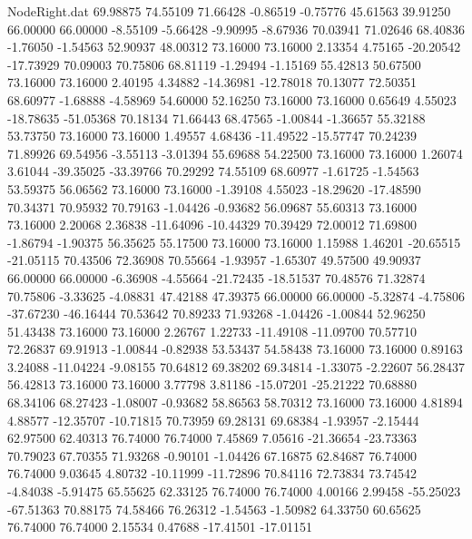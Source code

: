 \begin{filecontents}{NodeRight.dat}
  69.98875   74.55109   71.66428    -0.86519   -0.75776   45.61563   39.91250   66.00000   66.00000   -8.55109   -5.66428   -9.90995   -8.67936
  70.03941   71.02646   68.40836    -1.76050   -1.54563   52.90937   48.00312   73.16000   73.16000    2.13354    4.75165  -20.20542  -17.73929
  70.09003   70.75806   68.81119    -1.29494   -1.15169   55.42813   50.67500   73.16000   73.16000    2.40195    4.34882  -14.36981  -12.78018
  70.13077   72.50351   68.60977    -1.68888   -4.58969   54.60000   52.16250   73.16000   73.16000    0.65649    4.55023  -18.78635  -51.05368
  70.18134   71.66443   68.47565    -1.00844   -1.36657   55.32188   53.73750   73.16000   73.16000    1.49557    4.68436  -11.49522  -15.57747
  70.24239   71.89926   69.54956    -3.55113   -3.01394   55.69688   54.22500   73.16000   73.16000    1.26074    3.61044  -39.35025  -33.39766
  70.29292   74.55109   68.60977    -1.61725   -1.54563   53.59375   56.06562   73.16000   73.16000   -1.39108    4.55023  -18.29620  -17.48590
  70.34371   70.95932   70.79163    -1.04426   -0.93682   56.09687   55.60313   73.16000   73.16000    2.20068    2.36838  -11.64096  -10.44329
  70.39429   72.00012   71.69800    -1.86794   -1.90375   56.35625   55.17500   73.16000   73.16000    1.15988    1.46201  -20.65515  -21.05115
  70.43506   72.36908   70.55664    -1.93957   -1.65307   49.57500   49.90937   66.00000   66.00000   -6.36908   -4.55664  -21.72435  -18.51537
  70.48576   71.32874   70.75806    -3.33625   -4.08831   47.42188   47.39375   66.00000   66.00000   -5.32874   -4.75806  -37.67230  -46.16444
  70.53642   70.89233   71.93268    -1.04426   -1.00844   52.96250   51.43438   73.16000   73.16000    2.26767    1.22733  -11.49108  -11.09700
  70.57710   72.26837   69.91913    -1.00844   -0.82938   53.53437   54.58438   73.16000   73.16000    0.89163    3.24088  -11.04224   -9.08155
  70.64812   69.38202   69.34814    -1.33075   -2.22607   56.28437   56.42813   73.16000   73.16000    3.77798    3.81186  -15.07201  -25.21222
  70.68880   68.34106   68.27423    -1.08007   -0.93682   58.86563   58.70312   73.16000   73.16000    4.81894    4.88577  -12.35707  -10.71815
  70.73959   69.28131   69.68384    -1.93957   -2.15444   62.97500   62.40313   76.74000   76.74000    7.45869    7.05616  -21.36654  -23.73363
  70.79023   67.70355   71.93268    -0.90101   -1.04426   67.16875   62.84687   76.74000   76.74000    9.03645    4.80732  -10.11999  -11.72896
  70.84116   72.73834   73.74542    -4.84038   -5.91475   65.55625   62.33125   76.74000   76.74000    4.00166    2.99458  -55.25023  -67.51363
  70.88175   74.58466   76.26312    -1.54563   -1.50982   64.33750   60.65625   76.74000   76.74000    2.15534    0.47688  -17.41501  -17.01151

\end{filecontents}
